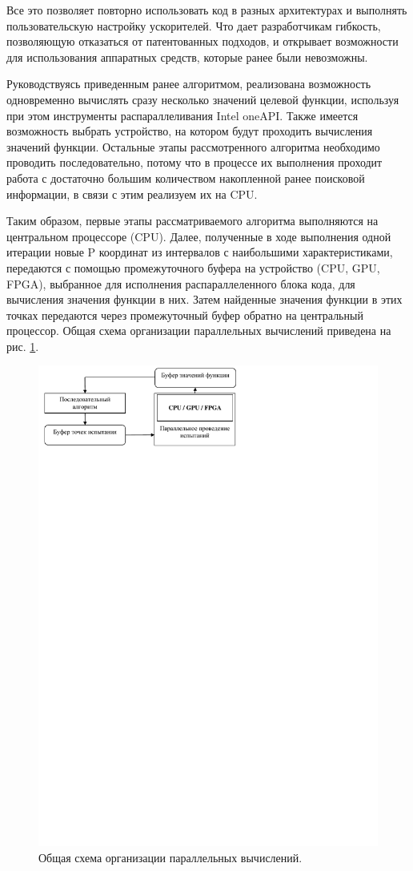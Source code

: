 \documentclass[10pt,a4paper]{book}
\begin{document}
Все это позволяет повторно использовать код в разных архитектурах и выполнять пользовательскую настройку ускорителей. Что дает разработчикам гибкость, позволяющую отказаться от патентованных подходов, и открывает возможности для использования аппаратных средств, которые ранее были невозможны.

Руководствуясь приведенным ранее алгоритмом, реализована возможность одновременно вычислять сразу несколько значений целевой функции, используя при этом инструменты распараллеливания Intel oneAPI. Также имеется возможность выбрать устройство, на котором будут проходить вычисления значений функции. Остальные этапы рассмотренного алгоритма необходимо проводить последовательно, потому что в процессе их выполнения проходит работа с достаточно большим количеством накопленной ранее поисковой информации, в связи с этим реализуем их на CPU. 

Таким образом, первые этапы рассматриваемого алгоритма выполняются на центральном процессоре (CPU). Далее, полученные в ходе выполнения одной итерации новые P координат из интервалов с наибольшими характеристиками, передаются с помощью промежуточного буфера на устройство (CPU, GPU, FPGA), выбранное для исполнения распараллеленного блока кода, для вычисления значения функции в них. Затем найденные значения функции в этих точках передаются через промежуточный буфер обратно на центральный процессор. Общая схема организации параллельных вычислений приведена на рис. \ref{fig:s1}.


\begin{figure}
\begin{center}
  \includegraphics[width=0.7\linewidth]{./pic/s1.pdf}
  \caption{Общая схема организации параллельных вычислений.}
  \label{fig:s1}  
\end{center}
\end{figure}
\end{document}
